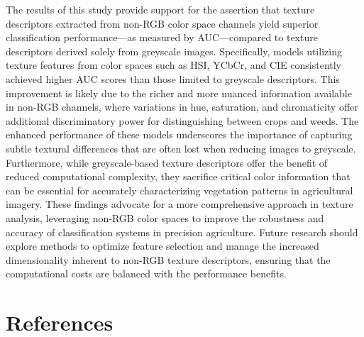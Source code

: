 \documentclass[letterpaper]{report}
\begin{document}
The results of this study provide support for the assertion that texture descriptors extracted from non-RGB color space channels yield superior classification performance—as measured by AUC—compared to texture descriptors derived solely from greyscale images. Specifically, models utilizing texture features from color spaces such as HSI, YCbCr, and CIE consistently achieved higher AUC scores than those limited to greyscale descriptors. This improvement is likely due to the richer and more nuanced information available in non-RGB channels, where variations in hue, saturation, and chromaticity offer additional discriminatory power for distinguishing between crops and weeds. The enhanced performance of these models underscores the importance of capturing subtle textural differences that are often lost when reducing images to greyscale. Furthermore, while greyscale-based texture descriptors offer the benefit of reduced computational complexity, they sacrifice critical color information that can be essential for accurately characterizing vegetation patterns in agricultural imagery. These findings advocate for a more comprehensive approach in texture analysis, leveraging non-RGB color spaces to improve the robustness and accuracy of classification systems in precision agriculture. Future research should explore methods to optimize feature selection and manage the increased dimensionality inherent to non-RGB texture descriptors, ensuring that the computational costs are balanced with the performance benefits.

\chapter{References}
\printbibliography[heading=none]

%
%
\end{document}
